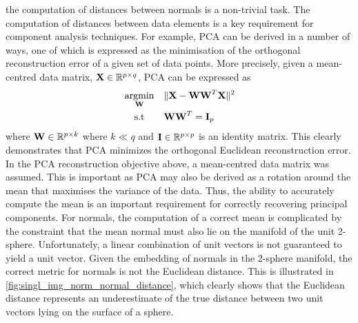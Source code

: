 the computation of distances between normals is a non-trivial task. The
computation of distances between data elements is a key requirement for
component analysis techniques. For example, PCA can be derived in a number of
ways, one of which is expressed as the minimisation of the orthogonal
reconstruction error of a given set of data points. More precisely, given
a mean-centred data matrix, $\boldsymbol{\mathbf{X}} \in \mathbb{R}^{p \times q}$, PCA can be expressed
as
\begin{equation*}
\begin{alignedat}{2}
	&\argmin_{\bb{W}} \quad &&\lVert \bb{X} - \bb{W} \bb{W}^T \bb{X} \rVert^2 \\
	&\quad \, \st      &&\bb{W} \bb{W}^T = \bb{I}_p
\end{alignedat}
\end{equation*}
where $\boldsymbol{\mathbf{W}} \in \mathbb{R}^{p \times k}$ where $k \ll q$ and
$\boldsymbol{\mathbf{I}} \in \mathbb{R}^{p \times p}$ is an identity matrix. This clearly demonstrates
that PCA minimizes the orthogonal Euclidean reconstruction error. In the PCA
reconstruction objective above, a mean-centred data matrix was assumed. This is
important as PCA may also be derived as a rotation around the mean that
maximises the variance of the data. Thus, the ability to accurately compute the
mean is an important requirement for correctly recovering principal components.
For normals, the computation of a correct mean
is complicated by the constraint that the mean normal must also lie on the
manifold of the unit 2-sphere. Unfortunately, a linear combination of unit
vectors is not guaranteed to yield a unit vector. Given the embedding of normals
in the 2-sphere manifold, the correct metric for normals is not the Euclidean
distance. This is illustrated in
\cref{fig:singl_img_norm_normal_distance}, which clearly shows that the Euclidean
distance represents an underestimate of the true distance between two unit
vectors lying on the surface of a sphere.
